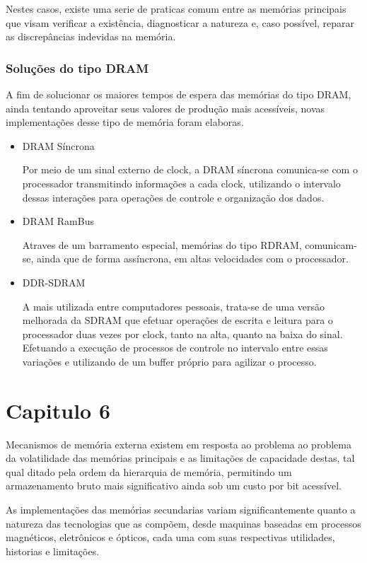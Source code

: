 \documentclass[12pt]{article}
\begin{document}
Nestes casos, existe uma serie de praticas comum entre as memórias principais que visam verificar a existência, diagnosticar a natureza e, caso possível, reparar as discrepâncias indevidas na memória. 


\subsubsection*{Soluções do tipo DRAM}
A fim de solucionar os maiores tempos de espera das memórias do tipo DRAM, ainda tentando aproveitar seus valores de produção mais acessíveis, novas implementações desse tipo de memória foram elaboras.

\begin{itemize}
\item DRAM Síncrona

Por meio de um sinal externo de clock, a DRAM síncrona comunica-se com o processador transmitindo informações a cada clock, utilizando o intervalo dessas interações para operações de controle e organização dos dados.

\item DRAM RamBus

Atraves de um barramento especial, memórias do tipo RDRAM, comunicam-se, ainda que de forma assíncrona, em altas velocidades com o processador.

\item DDR-SDRAM

A mais utilizada entre computadores pessoais, trata-se de uma versão melhorada da SDRAM que efetuar operações de escrita e leitura para o processador duas vezes por clock, tanto na alta, quanto na baixa do sinal. Efetuando a execução de processos de controle no intervalo entre essas variações e utilizando de um buffer próprio para agilizar o processo.
\end{itemize}
\section{Capitulo 6}
Mecanismos de memória externa existem em resposta ao problema ao problema da volatilidade das memórias principais e as limitações de capacidade destas, tal qual ditado pela ordem da hierarquia de memória, permitindo um armazenamento bruto mais significativo ainda sob um custo por bit acessível.

As implementações das memórias secundarias variam significantemente quanto a natureza das tecnologias que as compõem, desde maquinas baseadas em processos magnéticos, eletrônicos e ópticos, cada uma com suas respectivas utilidades, historias e limitações.
\end{document}
